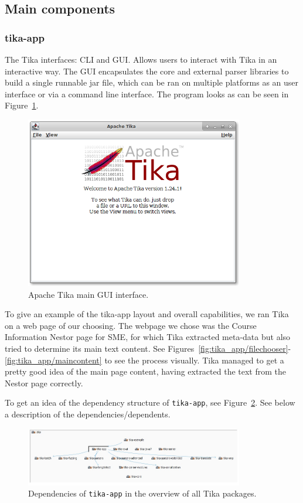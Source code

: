\documentclass{article}
\begin{document}
\subsection{Main components}
\subsubsection{tika-app}
The Tika interfaces: CLI and GUI. Allows users to interact with Tika in an interactive way. The GUI encapsulates the core and external parser libraries to build a single runnable jar file, which can be ran on multiple platforms as an user interface or via a command line interface. The program looks as can be seen in Figure~\ref{fig:tika_app/main}.

\begin{figure}[ht]
    \centering
    \includegraphics[width=0.85\textwidth]{report/images/tika_app/main.png}
    \caption{Apache Tika main GUI interface.}
    \label{fig:tika_app/main}
\end{figure}

To give an example of the tika-app layout and overall capabilities, we ran Tika on a web page of our choosing. The webpage we chose was the Course Information Nestor page for SME, for which Tika extracted meta-data but also tried to determine its main text content. See Figures~\ref{fig:tika_app/filechooser}-\ref{fig:tika_app/maincontent} to see the process visually. Tika managed to get a pretty good idea of the main page content, having extracted the text from the Nestor page correctly.

To get an idea of the dependency structure of \texttt{tika-app}, see Figure~\ref{fig:tika_app/s101-overview}. See below a description of the dependencies/dependents.
\begin{figure}[ht]
    \centering
    \includegraphics[width=0.85\textwidth]{report/images/tika_app/s101-overview.jpeg}
    \caption{Dependencies of \texttt{tika-app} in the overview of all Tika packages.}
    \label{fig:tika_app/s101-overview}
\end{figure}
\end{document}
